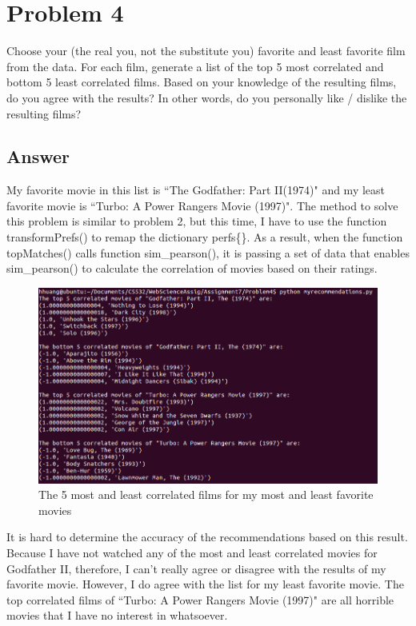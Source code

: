 \documentclass[12pt]{article}
\begin{document}


\section*{Problem 4}

Choose your (the real you, not the substitute you) favorite and
least favorite film from the data.  For each film, generate a list
of the top 5 most correlated and bottom 5 least correlated films.
Based on your knowledge of the resulting films, do you agree with
the results?  In other words, do you personally like / dislike
the resulting films?

\subsection*{Answer}

My favorite movie in this list is ``The Godfather: Part II(1974)" and my least favorite movie is ``Turbo: A Power Rangers Movie (1997)". The method to solve this problem is similar to problem 2, but this time, I have to use the function transformPrefs() to remap the dictionary perfs\{\}. As a result, when the function topMatches() calls function sim\_pearson(), it is passing a set of data that enables sim\_pearson() to calculate the correlation of movies based on their ratings. 

\begin{figure}[h]
\centering
\includegraphics[width=6.5in]{myrecommendations.png}
\caption{The 5 most and least correlated films for my most and least favorite movies}
\end{figure}

It is hard to determine the accuracy of the recommendations based on this result. Because I have not watched any of the most and least correlated movies for Godfather II, therefore, I can't really agree or disagree with the results of my favorite movie. However, I do agree with the list for my least favorite movie. The top correlated films of ``Turbo: A Power Rangers Movie (1997)" are all horrible movies that I have no interest in whatsoever. 
\pagebreak


\end{document}
